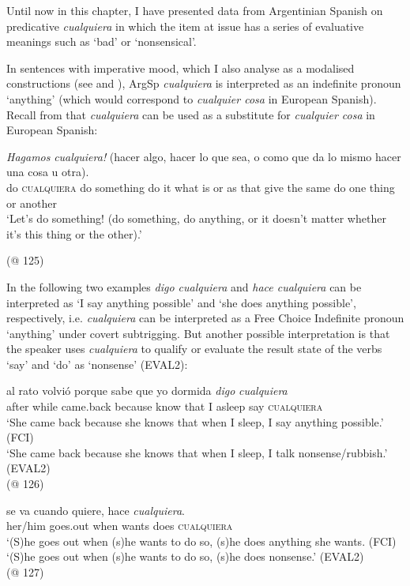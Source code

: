 Until now in this chapter, I have presented data from Argentinian Spanish on predicative \textit{cualquiera} in which the item at issue has a series of evaluative meanings such as ‘bad’ or ‘nonsensical’.

In sentences with imperative mood, which I also analyse as a modalised constructions (see \citealt{am2018} and ), ArgSp \textit{cualquiera} is interpreted as an indefinite pronoun ‘anything’ (which would correspond to \textit{cualquier cosa} in European Spanish). Recall from  that \textit{cualquiera} can be used as a substitute for \textit{cualquier cosa} in European Spanish:

\ea \label{ex:key:212} %
    \textit{Hagamos} \textit{cualquiera!} (hacer algo, hacer lo que sea, o como que da lo mismo hacer una cosa u otra).\\
do \textsc{cualquiera} do something do it what is or as that give the same do one thing or another\\ 
    \glt ‘Let’s do something! (do something, do anything, or it doesn’t matter whether it’s this thing or the other).’

(@ 125)
\z

In the following two examples \textit{digo cualquiera} and \textit{hace cualquiera} can be interpreted as ‘I say anything possible’ and ‘she does anything possible’, respectively, i.e. \textit{cualquiera} can be interpreted as a Free Choice Indefinite pronoun ‘anything’ under covert subtrigging. But another possible interpretation is that the speaker uses \textit{cualquiera} to qualify or evaluate the result state of the verbs ‘say’ and ‘do’ as ‘nonsense’ (EVAL2):

\ea \label{ex:key:213} %
\gll al rato volvió porque sabe que yo dormida \textit{digo} \textit{cualquiera}\\
   after while came.back because know that I asleep say \textsc{cualquiera}\\
\ea ‘She came back because she knows that when I sleep, I say anything possible.’ (FCI)\\

\ex ‘She came back because she knows that when I sleep, I talk nonsense/rubbish.’ (EVAL2)\\
    (@ 126)
\z 
\z 

\ea \label{ex:key:214} %
\gll se va cuando quiere, hace \textit{cualquiera}.\\
    her/him goes.out when wants does \textsc{cualquiera}\\
\ea  ‘(S)he goes out when (s)he wants to do so, (s)he does anything she wants. (FCI)\\
\ex ‘(S)he goes out when (s)he wants to do so, (s)he does nonsense.’ (EVAL2)\\
    (@ 127)
\z
\z 

